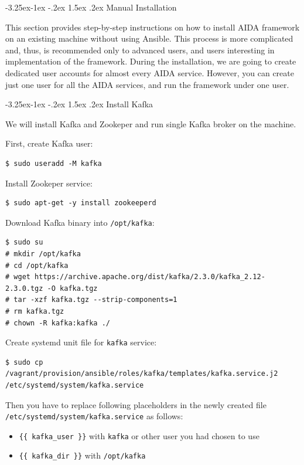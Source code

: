 \documentclass[a4paper]{article} %
\makeatletter
\renewcommand{\normalsize}{\fontsize{12}{15}\selectfont\color{textcolor}}
\renewcommand\subsection{\@startsection{subsection}{2}{\z@}%
                   {-3.25ex\@plus -1ex \@minus -.2ex}%
                   {1.5ex \@plus .2ex}%
                   {\normalfont\sffamily\large\bfseries\color{projectcolor}}}
\renewcommand\subsubsection{\@startsection{subsubsection}{3}{\z@}%
                   {-3.25ex\@plus -1ex \@minus -.2ex}%
                   {1.5ex \@plus .2ex}%
                   {\normalfont\sffamily\normalsize\bfseries\color{projectcolor}}}
\makeatother
\begin{document}

\subsection{Manual Installation}

This section provides step-by-step instructions on how to install AIDA framework on an existing machine without using Ansible. This process is more complicated and, thus, is recommended only to advanced users, and users interesting in implementation of the framework. During the installation, we are going to create dedicated user accounts for almost every AIDA service. However, you can create just one user for all the AIDA services, and run the framework under one user.

\subsubsection{Install Kafka}

We will install Kafka and Zookeper and run single Kafka broker on the machine.

First, create Kafka user:
\begin{lstlisting}
$ sudo useradd -M kafka
\end{lstlisting}

Install Zookeper service:
\begin{lstlisting}
$ sudo apt-get -y install zookeeperd
\end{lstlisting}

Download Kafka binary into \texttt{/opt/kafka}:
\begin{lstlisting}
$ sudo su
# mkdir /opt/kafka
# cd /opt/kafka
# wget https://archive.apache.org/dist/kafka/2.3.0/kafka_2.12-2.3.0.tgz -O kafka.tgz
# tar -xzf kafka.tgz --strip-components=1
# rm kafka.tgz
# chown -R kafka:kafka ./
\end{lstlisting}

Create systemd unit file for \texttt{kafka} service:
\begin{lstlisting}
$ sudo cp /vagrant/provision/ansible/roles/kafka/templates/kafka.service.j2 /etc/systemd/system/kafka.service
\end{lstlisting}

Then you have to replace following placeholders in the newly created file \texttt{/etc/systemd/system/kafka.service} as follows:
\begin{itemize}[noitemsep,nolistsep]
\item \texttt{\{\{ kafka\_user \}\}} with \texttt{kafka} or other user you had chosen to use
\item \texttt{\{\{ kafka\_dir \}\}} with \texttt{/opt/kafka}
\end{itemize}
\end{document}
